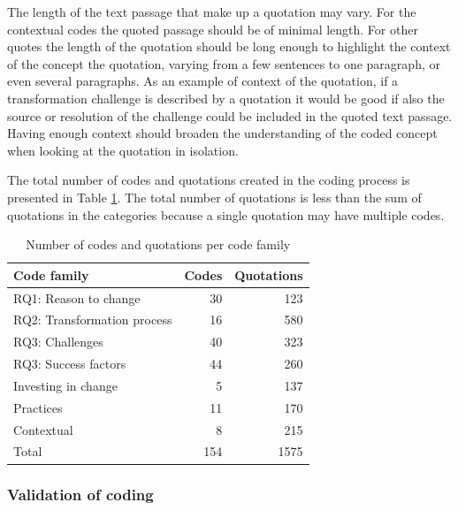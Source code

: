 \documentclass[preprint,authoryear,12pt]{elsarticle}
\begin{document}
The length of the text passage that make up a quotation may vary. For the
contextual codes the quoted passage should be of minimal length. For other
quotes the length of the quotation should be long enough to highlight the
context of the concept the quotation, varying from a few sentences to one
paragraph, or even several paragraphs. As an example of context of the
quotation, if a transformation challenge is described by a quotation it would be
good if also the source or resolution of the challenge could be included in the
quoted text passage. Having enough context should broaden the understanding
of the coded concept when looking at the quotation in isolation.


The total number of codes and quotations created in the coding process is
presented in Table \ref{table:codecount}. The total number of quotations is less
than the sum of quotations in the categories because a single quotation may have
multiple codes.

\begin{table}[h]
    \centering
    \begin{tabular}{ l r r }
        \toprule
        Code family    &  Codes  &  Quotations
        \\
        \midrule
        RQ1: Reason to change &        30 &  123 \\
		RQ2: Transformation process &  16 &  580 \\
		RQ3: Challenges &              40 &  323 \\
		RQ3: Success factors &         44 &  260 \\
		Investing in change  &          5 &  137 \\
		Practices &                    11 &  170 \\
		Contextual &                    8 &  215 \\
		Total &                       154 & 1575 \\
        \bottomrule
    \end{tabular}
    \caption{Number of codes and quotations per code family}
    \label{table:codecount}
\end{table}

\clearpage

\subsubsection{Validation of coding}
\end{document}
